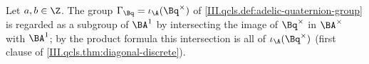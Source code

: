 Let $a,b\in\Z$. The group $\Gamma_{\Bq}=\iota_\A(\Bq^\times)$ of \cref{III.qcls.def:adelic-quaternion-group} is regarded as a subgroup of $\BA^1$ by intersecting
the image of $\Bq^\times$ in $\BA^\times$ with $\BA^1$; by the product formula this intersection is all of $\iota_\A(\Bq^\times)$
(first clause of \cref{III.qcls.thm:diagonal-discrete}).
